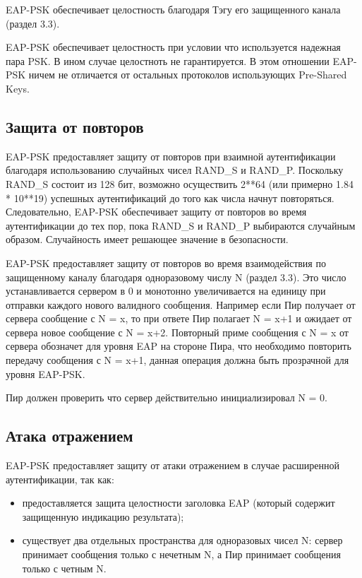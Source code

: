 EAP-PSK обеспечивает целостность благодаря Тэгу его защищенного канала (раздел 3.3).

EAP-PSK обеспечивает целостность при условии что используется надежная пара PSK. В ином случае целостноть не гарантируется.  В этом отношении EAP-PSK ничем не отличается от остальных протоколов использующих Pre-Shared Keys.

\subsection{Защита от повторов}

EAP-PSK предоставляет защиту от повторов при взаимной аутентификации благодаря использованию случайных чисел RAND\_S и RAND\_P. Поскольку RAND\_S состоит из 128 бит, возможно осуществить 2**64 (или примерно 1.84 * 10**19) успешных аутентификаций до того как числа начнут повторяться. Следовательно, EAP-PSK обеспечивает защиту от повторов во время аутентификации до тех пор, пока RAND\_S и RAND\_P выбираются случайным образом. Случайность имеет решающее значение в безопасности.

EAP-PSK предоставляет защиту от повторов  во время взаимодействия по защищенному каналу благодаря одноразовому числу N (раздел 3.3). Это число устанавливается сервером в 0 и монотонно увеличивается на единицу при отправки каждого нового валидного сообщения. Например если Пир получает от сервера сообщение с N = x, то при ответе Пир полагает N = x+1 и ожидает от сервера новое сообщение с N = x+2. Повторный приме сообщения с N = x от сервера обозначет для уровня EAP на стороне Пира, что необходимо повторить передачу сообщения с N = x+1, данная операция должна быть прозрачной для уровня EAP-PSK.

Пир должен проверить что сервер действительно инициализировал N = 0.

\subsection{Атака отражением}

EAP-PSK предоставляет защиту от атаки отражением в случае расширенной аутентификации, так как:

\begin{itemize}
\item предоставляется защита целостности заголовка EAP (который содержит защищенную индикацию результата);
\item существует два отдельных пространства для одноразовых чисел N: сервер принимает сообщения только с нечетным N, а Пир принимает сообщения только с четным N.
\end{itemize}
